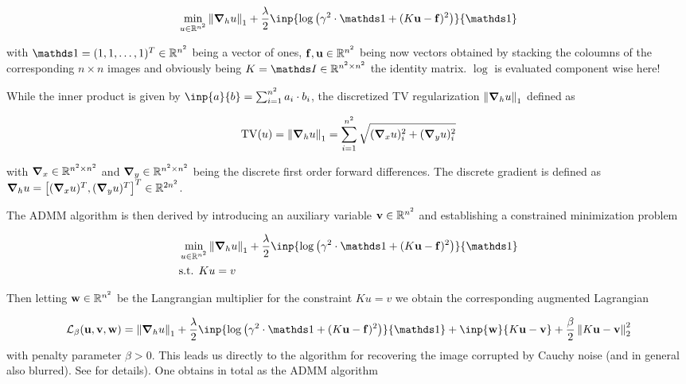 \begin{equation}
\min_{u \in \R^{n^2}} \norm{\grad{u}{h}}_1 + \frac{\lambda}{2} \inp{\log \left(\gamma^2 \cdot \one + (K \vec{u} - \vec{f})^2 \right)}{\one}
\end{equation}

with $\one = (1,1,\ldots,1)^T \in \R^{n^2}$ being a vector of ones, $\vb*{\vb{f}}, \vb*{\vb{u}} \in \mathbb{R}^{n^2}$ being now vectors obtained by stacking the coloumns of the corresponding $n \times n$ images and obviously being $K = \id \in \R^{n^2 \times n^2}$ the identity matrix. $\log$ is evaluated component wise here!

While the inner product is given by $\inp{a}{b} = \sum_{i=1}^{n^2} a_i \cdot b_i$, the discretized TV regularization $\norm{\grad{u}{h}}_1$ defined as

\begin{equation}
    \TV(u) = \norm{\grad{u}{h}}_1 = \sum_{i=1}^{n^2} \sqrt{(\grad{u}{x})_i^2 + (\grad{u}{y})_i^2}
\end{equation}

with $\grad{}{x} \in \R^{n^2 \times n^2}$ and $\grad{}{y} \in \R^{n^2 \times n^2}$ being the discrete first order forward differences. The discrete gradient is defined as $\grad{u}{h} = \left[(\grad{u}{x})^T, (\grad{u}{y})^T\right]^T \in \R^{2n^2}$.

The ADMM algorithm is then derived by introducing an auxiliary variable $\vb*{\vb{v}} \in \mathbb{R}^{n^2}$ and establishing a constrained minimization problem

\begin{align}
    &\min_{u \in \R^{n^2}} \norm{\grad{u}{h}}_1 + \frac{\lambda}{2} \inp{\log \left(\gamma^2 \cdot \one + (K \vec{u} - \vec{f})^2 \right)}{\one}\\
    &\text{s.t. } Ku = v
\end{align}

Then letting $\vb*{\vb{w}} \in \mathbb{R}^{n^2}$ be the Langrangian multiplier for the constraint $Ku = v$ we obtain the corresponding augmented Lagrangian

\begin{equation}
    \mathcal{L}_{\beta}(\vec{u},\vec{v},\vec{w}) = \norm{\grad{u}{h}}_1 + \frac{\lambda}{2} \inp{\log \left(\gamma^2 \cdot \one + (K \vec{u} - \vec{f})^2 \right)}{\one} + \inp{\vec{w}}{K \vec{u}-\vec{v}} + \frac{\beta}{2} \norm{K \vec{u} - \vec{v}}_2^2
\end{equation}
with penalty parameter $\beta > 0$. This leads us directly to the algorithm for recovering the image corrupted by Cauchy noise (and in general also blurred).
See \cite[4.1]{MR3761275} for details). One obtains in total as the ADMM algorithm

